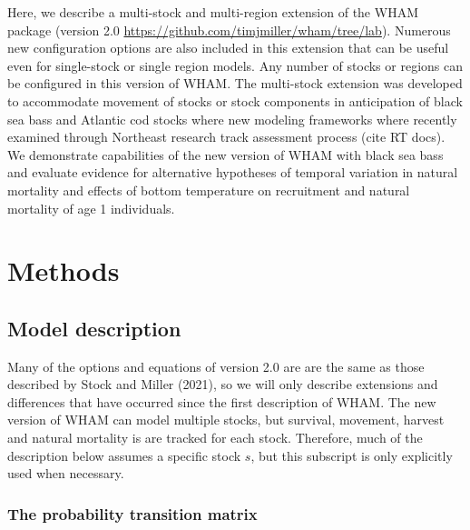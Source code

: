 \documentclass[
]{article}
\begin{document}
Here, we describe a multi-stock and multi-region extension of the WHAM
package (version 2.0 \url{https://github.com/timjmiller/wham/tree/lab}).
Numerous new configuration options are also included in this extension
that can be useful even for single-stock or single region models. Any
number of stocks or regions can be configured in this version of WHAM.
The multi-stock extension was developed to accommodate movement of
stocks or stock components in anticipation of black sea bass and
Atlantic cod stocks where new modeling frameworks where recently
examined through Northeast research track assessment process (cite RT
docs). We demonstrate capabilities of the new version of WHAM with black
sea bass and evaluate evidence for alternative hypotheses of temporal
variation in natural mortality and effects of bottom temperature on
recruitment and natural mortality of age 1 individuals.

\hypertarget{methods}{%
\section*{Methods}\label{methods}}

\hypertarget{model-description}{%
\subsection*{Model description}\label{model-description}}

Many of the options and equations of version 2.0 are are the same as
those described by Stock and Miller (2021), so we will only describe
extensions and differences that have occurred since the first
description of WHAM. The new version of WHAM can model multiple stocks,
but survival, movement, harvest and natural mortality is are tracked for
each stock. Therefore, much of the description below assumes a specific
stock \(s\), but this subscript is only explicitly used when necessary.

\hypertarget{the-probability-transition-matrix}{%
\subsubsection*{The probability transition
matrix}\label{the-probability-transition-matrix}}
\end{document}
